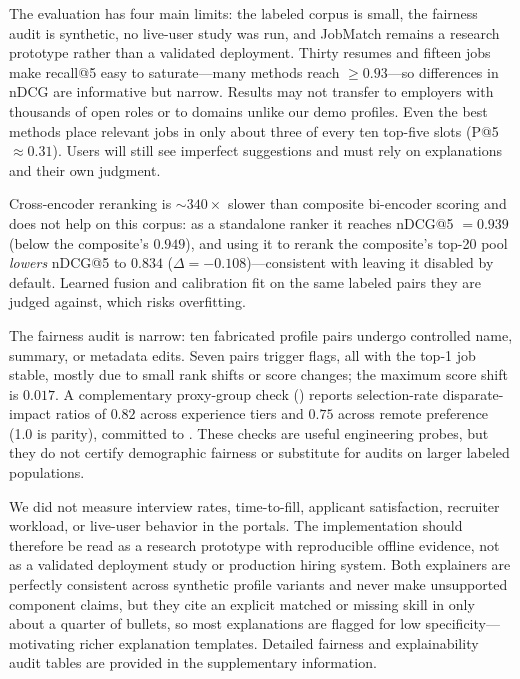 The evaluation has four main limits: the labeled corpus is small, the fairness audit is synthetic, no live-user study was run, and JobMatch remains a research prototype rather than a validated deployment.
Thirty resumes and fifteen jobs make recall@5 easy to saturate---many methods reach ${\ge}0.93$---so differences in nDCG are informative but narrow.
Results may not transfer to employers with thousands of open roles or to domains unlike our demo profiles.
Even the best methods place relevant jobs in only about three of every ten top-five slots (P@5 $\approx 0.31$).
Users will still see imperfect suggestions and must rely on explanations and their own judgment.

Cross-encoder reranking is ${\sim}340\times$ slower than composite bi-encoder scoring and does not help on this corpus: as a standalone ranker it reaches nDCG@5 $= 0.939$ (below the composite's $0.949$), and using it to rerank the composite's top-20 pool \emph{lowers} nDCG@5 to $0.834$ ($\Delta{=}{-}0.108$)---consistent with leaving it disabled by default.
Learned fusion and calibration fit on the same labeled pairs they are judged against, which risks overfitting.

The fairness audit is narrow: ten fabricated profile pairs undergo controlled name, summary, or metadata edits.
Seven pairs trigger flags, all with the top-1 job stable, mostly due to small rank shifts or score changes; the maximum score shift is $0.017$.
A complementary proxy-group check () reports selection-rate disparate-impact ratios of $0.82$ across experience tiers and $0.75$ across remote preference (1.0 is parity), committed to .
These checks are useful engineering probes, but they do not certify demographic fairness or substitute for audits on larger labeled populations.

We did not measure interview rates, time-to-fill, applicant satisfaction, recruiter workload, or live-user behavior in the portals.
The implementation should therefore be read as a research prototype with reproducible offline evidence, not as a validated deployment study or production hiring system.
Both explainers are perfectly consistent across synthetic profile variants and never make unsupported component claims, but they cite an explicit matched or missing skill in only about a quarter of bullets, so most explanations are flagged for low specificity---motivating richer explanation templates.
Detailed fairness and explainability audit tables are provided in the supplementary information.

